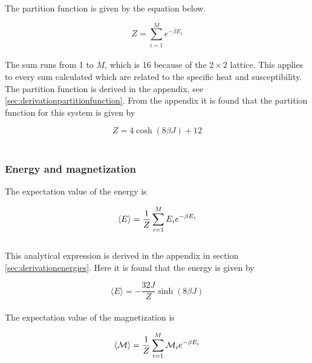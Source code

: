 \documentclass{article}
\begin{document}
The partition function is given by the equation below.

\begin{equation} \label{eq:partitionfunction}
    Z = \sum_{i=1} ^{M} e^{- \beta E_i}
\end{equation} \\

The sum runs from 1 to $M$, which is 16 because of the $ 2 \times 2 $ lattice. This applies to every sum calculated which are related to the specific heat and susceptibility. \\

The partition function is derived in the appendix, see \ref{sec:derivationpartitionfunction}. From the appendix it is found that the partition function for this system is given by

\begin{equation} \label{eq:finalpartitionfunction}
    Z = 4 \cosh(8 \beta J) + 12
\end{equation} \\


\subsubsection{Energy and magnetization} \label{sec:energyandmagnetization}

The expectation value of the energy is

\begin{equation}    \label{eq:expectationenergy}
    \langle E \rangle = \frac{1}{Z} \sum _{i=1} ^M E_i e^{- \beta E_i} \\
\end{equation} \\

This analytical expression is derived in the appendix in section \ref{sec:derivationenergies}. Here it is found that the energy is given by

\begin{equation} \label{eq:finalenergy}
    \langle E \rangle = - \frac{32 J}{Z} \sinh(8 \beta J)
\end{equation} \\

The expectation value of the magnetization is

\begin{equation}    \label{eq:magnetization}
    \langle \mathcal{M} \rangle = \frac{1}{Z} \sum _{i=1} ^M \mathcal{M}_i e^{- \beta E_i} \\
\end{equation} \\
\end{document}
